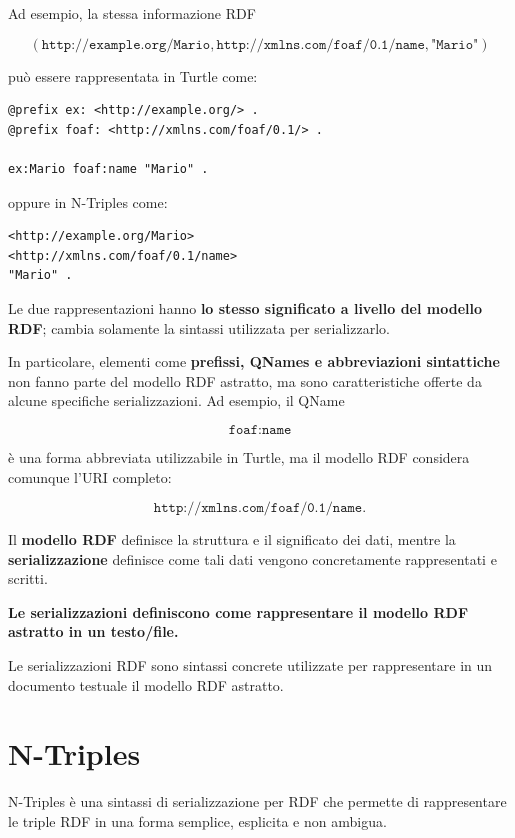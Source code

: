 Ad esempio, la stessa informazione RDF

\[
\left(
\texttt{http://example.org/Mario},
\texttt{http://xmlns.com/foaf/0.1/name},
\texttt{"Mario"}
\right)
\]

può essere rappresentata in Turtle come:

\begin{verbatim}
@prefix ex: <http://example.org/> .
@prefix foaf: <http://xmlns.com/foaf/0.1/> .

ex:Mario foaf:name "Mario" .
\end{verbatim}

oppure in N-Triples come:

\begin{verbatim}
<http://example.org/Mario>
<http://xmlns.com/foaf/0.1/name>
"Mario" .
\end{verbatim}

Le due rappresentazioni hanno \textbf{lo stesso significato a livello del modello RDF}; cambia solamente la sintassi utilizzata per serializzarlo.

In particolare, elementi come \textbf{prefissi, QNames e abbreviazioni sintattiche} non fanno parte del modello RDF astratto, ma sono caratteristiche offerte da alcune specifiche serializzazioni. Ad esempio, il QName

$$
\texttt{foaf:name}
$$

è una forma abbreviata utilizzabile in Turtle, ma il modello RDF considera comunque l'URI completo:

$$
\texttt{http://xmlns.com/foaf/0.1/name}.
$$


Il \textbf{modello RDF} definisce la struttura e il significato dei dati, mentre la \textbf{serializzazione} definisce come tali dati vengono concretamente rappresentati e scritti.

\begin{center}
    \textbf{Le serializzazioni definiscono come rappresentare il modello RDF astratto in un testo/file.}    
\end{center}

Le serializzazioni RDF sono sintassi concrete utilizzate per rappresentare in un documento testuale il modello RDF astratto.


\section{N-Triples}

N-Triples è una sintassi di serializzazione per RDF che permette di rappresentare le triple RDF in una forma semplice, esplicita e non ambigua.

